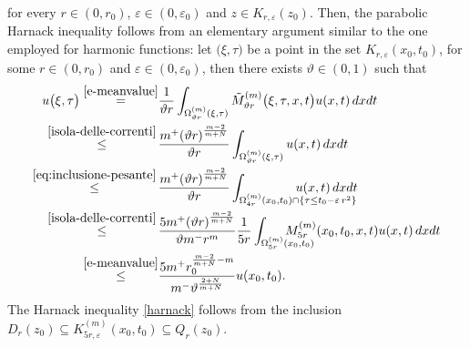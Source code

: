\documentclass[11pt,a4paper]{article}
\numberwithin{equation}{section}
\def \tt {\tilde}
\def \e {{\varepsilon}}
\def \t {{\tau}}
\def \x {{\xi}}
\def \O {{\Omega}}
\begin{document}
{{\begin{equation}
\end{equation}
for every $r \in (0,r_0)$, $\e \in (0, \e_0)$ and $z \in K_{r,\e	}(z_0)$. Then, the parabolic Harnack inequality follows from an elementary argument similar to the one employed for harmonic functions: let $\big(\x,\t\big)$ be a point in the set $K_{r,\e	}(x_0,t_0)$, for some $r \in (0,r_0)$ and $\e \in (0, \e_0)$, then there exists $\vartheta\in(0,1)$ such that
\begin{equation}
	\begin{aligned}
		u\big(\x,\t\big)\overset{\eqref{e-meanvalue}}=&\frac{1}{\vartheta r } \int_{\Omega_{\vartheta r}^{(m)}(\x,\t)} \tt M_{\vartheta r}^{(m)} \big(\x,\t,x,t\big) u(x,t) \, dx dt \\
		\overset{\eqref{isola-delle-correnti}}\leq\, &\frac{m^+{(\vartheta r)}^{\frac{m-2}{m+N}}}{\vartheta r} \int_{\Omega_{\vartheta r}^{(m)}(\x,\t)} u(x,t) \, dx dt\\
		\overset{\eqref{eq:inclusione-pesante}}\leq\,&\frac{m^+ {(\vartheta r)}^{\frac{m-2}{m+N}}}{\vartheta r} \int_{\O^{(m)}_{4 r}(x_0, t_0)\cap \left\{\t\leq t_0 - \e\,r^2\right\}} \!\!\!\!\!\!\!\!\!\!\!\!\!\!\!\!\!\!\!\!\!\!\!\!\!\!\!\!\!\! u(x,t) \, dx dt\\
		\overset{\eqref{isola-delle-correnti}}\leq\, &\frac{5m^+{(\vartheta r)}^{\frac{m-2}{m+N}}}{\vartheta m^-r^m }\frac{1}{5 r } \int_{\O^{(m)}_{5r }(x_0, t_0)}\!\!\!\!\!\!\!\!\!\!\!\!\!\!\! M_{5r}^{(m)} (x_0,t_0,x,t) u(x,t) \, dx dt \\
		\overset{\eqref{e-meanvalue}}\leq &\frac{5m^+ r_0^{\frac{m-2}{m+N}-m}}{m^-\vartheta^{\frac{2+N}{m+N}} } u(x_0,t_0).
	\end{aligned}
\end{equation}
The Harnack inequality \eqref{harnack} follows from the inclusion $D_r(z_0)\subseteq K_{5r,\e}^{(m)}(x_0, t_0)\subseteq  Q_{r}(z_0)$.

\medskip

}}
\end{document}
